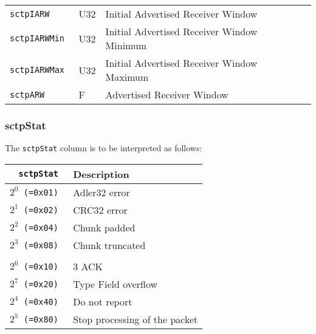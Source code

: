 \documentclass[documentation]{subfiles}
\begin{document}
\begin{longtable}{>{\tt}lll>{\tt\small}l}
    sctpIARW                        & U32           & Initial Advertised Receiver Window          & \\
    sctpIARWMin                     & U32           & Initial Advertised Receiver Window Minimum  & \\
    sctpIARWMax                     & U32           & Initial Advertised Receiver Window Maximum  & \\
    sctpARW                         & F             & Advertised Receiver Window                  & \\
    \bottomrule
\end{longtable}

\clearpage

\subsubsection{sctpStat}\label{sctpStat}
The {\tt sctpStat} column is to be interpreted as follows:
\begin{longtable}{>{\tt}rl}
    \toprule
    {\bf sctpStat}      & {\bf Description}\\
    \midrule\endhead%
    $2^0$ (=0x01) & Adler32 error \\
    $2^1$ (=0x02) & CRC32 error\\
    $2^2$ (=0x04) & Chunk padded\\
    $2^3$ (=0x08) & Chunk truncated\\
    \\
    $2^6$ (=0x10) & 3 ACK\\
    $2^7$ (=0x20) & Type Field overflow\\
    $2^4$ (=0x40) & Do not report\\
    $2^5$ (=0x80) & Stop processing of the packet\\
    \bottomrule
\end{longtable}
\end{document}
